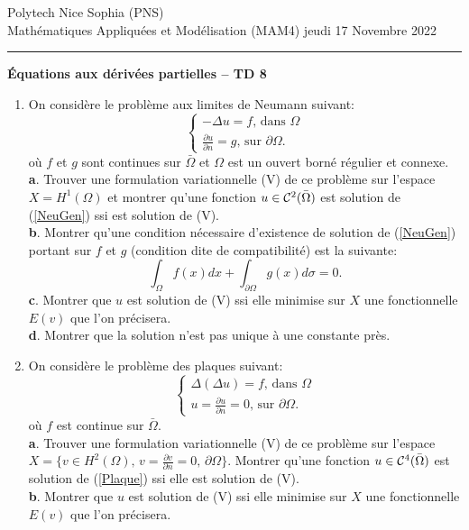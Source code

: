 \documentclass[12pt,a4paper]{article}
\begin{document}
 \hfill Polytech Nice Sophia (PNS)\\
\noindent Math\'ematiques Appliqu\'ees et Mod\'elisation (MAM4) \hfill jeudi 17 Novembre 2022 \\

\hrule

\bigskip
\bigskip

\begin{center}{\bf \'Equations aux d\'eriv\'ees partielles --
TD 8}\end{center}

\bigskip
\begin{enumerate}
\item On consid\`ere le probl\`eme aux limites de Neumann suivant:
\begin{equation}\label{NeuGen}
\begin{cases}
-\Delta u = f,\,\text{dans }\Omega\\
\frac{\partial u}{\partial n} = g,\,\text{sur }\partial\Omega.
\end{cases}
\end{equation}
o\`u $f$ et $g$ sont continues sur $\bar\Omega$ et $\Omega$ est un ouvert born\'e r\'egulier et connexe.\\
{\bf a}. Trouver une formulation variationnelle (V) de ce probl\`eme sur l'espace $X=H^1(\Omega)$ et montrer qu'une fonction $u\in{\cal C}^2(\bar\Omega)$ est solution de (\ref{NeuGen}) ssi est solution de (V).\\
{\bf b}. Montrer qu'une condition n\'ecessaire d'existence de solution
de (\ref{NeuGen}) portant sur $f$ et $g$ (condition dite de
compatibilit\'e) est la suivante:
$$
\int_{\Omega}f(x)dx+ \int_{\partial\Omega} g(x)d\sigma= 0.
$$
{\bf c}. Montrer que $u$ est solution de (V) ssi elle minimise sur $X$ une fonctionnelle $E(v)$ que l'on pr\'ecisera.\\
{\bf d}. Montrer que la solution n'est pas unique à une constante pr\`es. 

\item On consid\`ere le probl\`eme des plaques suivant:
\begin{equation}\label{Plaque}
\begin{cases}
\Delta(\Delta u) = f,\,\text{dans }\Omega\\
u = \frac{\partial u}{\partial n} = 0,\,\text{sur }\partial\Omega.
\end{cases}
\end{equation}
o\`u $f$ est continue sur $\bar\Omega$.\\
{\bf a}. Trouver une formulation variationnelle (V) de ce probl\`eme sur l'espace $X=\{v\in H^2(\Omega),\, v=\frac{\partial v}{\partial n}=0,\, \partial\Omega\}$. Montrer qu'une fonction $u\in{\cal C}^4(\bar\Omega)$ est solution de (\ref{Plaque}) ssi elle est solution de (V).\\
{\bf b}. Montrer que $u$ est solution de (V) ssi elle minimise sur $X$ une fonctionnelle $E(v)$ que l'on pr\'ecisera.\\


\end{enumerate}
\end{document}
